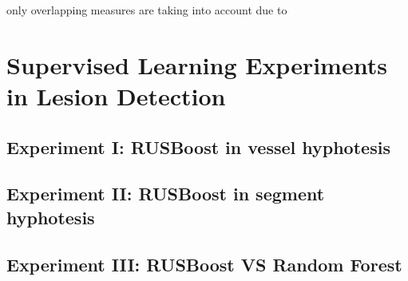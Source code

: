 only overlapping measures are taking into account due to 


\section{Supervised Learning Experiments in Lesion Detection}


\subsection{Experiment I: RUSBoost in vessel hyphotesis}
\subsection{Experiment II: RUSBoost in segment hyphotesis}

\subsection{Experiment III: RUSBoost VS Random Forest}



